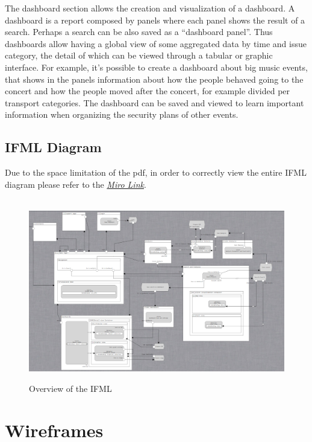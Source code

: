 \documentclass[../main.tex]{subfiles}
\begin{document}
    The dashboard section allows the creation and visualization of a dashboard. A dashboard is a report composed by panels where each panel shows the result of a search. Perhaps a search can be also saved as a “dashboard panel”. Thus dashboards allow having a global view of some aggregated data by time and issue category, the detail of which can be viewed through a tabular or graphic interface. For example, it’s possible to create a dashboard about big music events, that shows in the panels information about how the people behaved going to the concert and how the people moved after the concert, for example divided per transport categories. The dashboard can be saved and viewed to learn important information when organizing the security plans of other events.

    \section{IFML Diagram}\label{sec:ifml-diagram}
    Due to the space limitation of the pdf, in order to correctly view the entire IFML diagram please refer to the \href{https://miro.com/app/board/o9J_kuKN_dk=/}{\textit{Miro Link}}.
    \\
    \\
    \begin{figure}[H]
        \centering
        \includegraphics[scale = 1.5]{assets/ifml/ifml_sum.png} \\
        \caption[]{Overview of the IFML}\label{fig:figure4}
    \end{figure}
    \chapter{Wireframes}\label{ch:wireframes}
\end{document}

